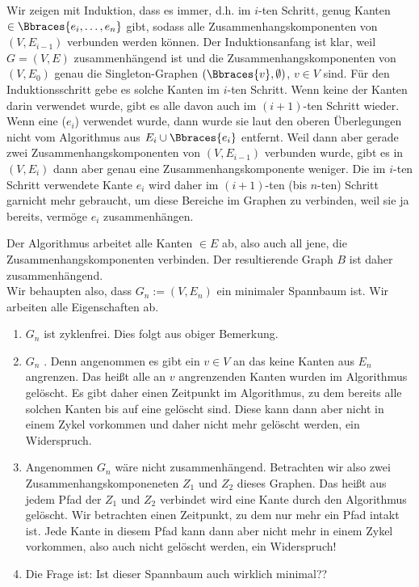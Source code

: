 \begin{solution}
\begin{enumerate}[label = (\Alph*)]
    Wir zeigen mit Induktion, dass es immer, d.h. im $i$-ten Schritt, genug Kanten $\in \Bbraces{e_i, \dots, e_n}$ gibt, sodass alle Zusammenhangskomponenten von $(V, E_{i-1})$ verbunden werden können.
    Der Induktionsanfang ist klar, weil $G = (V, E)$ zusammenhängend ist und die Zusammenhangskomponenten von $(V, E_0)$ genau die Singleton-Graphen $(\Bbraces{v}, \emptyset)$, $v \in V$ sind.
    Für den Induktionsschritt gebe es solche Kanten im $i$-ten Schritt.
    Wenn keine der Kanten darin verwendet wurde, gibt es alle davon auch im $(i+1)$-ten Schritt wieder.
    Wenn eine ($e_i$) verwendet wurde, dann wurde sie laut den oberen Überlegungen nicht vom Algorithmus aus $E_i \cup \Bbraces{e_i}$ entfernt.
    Weil dann aber gerade zwei Zusammenhangskomponenten von $(V, E_{i-1})$ verbunden wurde, gibt es in $(V, E_i)$ dann aber genau eine Zusammenhangskomponente weniger.
    Die im $i$-ten Schritt verwendete Kante $e_i$ wird daher im $(i+1)$-ten (bis $n$-ten) Schritt garnicht mehr gebraucht, um diese Bereiche im Graphen zu verbinden, weil sie ja bereits, vermöge $e_i$ zusammenhängen.

    Der Algorithmus arbeitet alle Kanten $\in E$ ab, also auch all jene, die Zusammenhangskomponenten verbinden.
    Der resultierende Graph $B$ ist daher zusammenhängend.\\ 
    
    Wir behaupten also, dass $G_n:=(V,E_n)$ ein minimaler Spannbaum ist. Wir arbeiten alle Eigenschaften ab.
    \begin{enumerate}
    	\item $G_n$ ist zyklenfrei. Dies folgt aus obiger Bemerkung. 
    	
    	\item $G_n$ . Denn angenommen es gibt ein $v \in V$ an das keine Kanten aus $E_n$ angrenzen. Das heißt alle an $v$ angrenzenden Kanten wurden im Algorithmus gelöscht. Es gibt daher einen Zeitpunkt im Algorithmus, zu dem bereits alle solchen Kanten bis auf eine gelöscht sind. Diese kann dann aber nicht in einem Zykel vorkommen und daher nicht mehr gelöscht werden, ein Widerspruch.
    	
    	\item Angenommen $G_n$ wäre nicht zusammenhängend. Betrachten wir also zwei Zusammenhangskomponeneten $Z_1$ und $Z_2$ dieses Graphen. Das heißt aus jedem Pfad der $Z_1$ und $Z_2$ verbindet wird eine Kante durch den Algorithmus gelöscht. Wir betrachten einen Zeitpunkt, zu dem nur mehr ein Pfad intakt ist. Jede Kante in diesem Pfad kann dann aber nicht mehr in einem Zykel vorkommen, also auch nicht gelöscht werden, ein Widerspruch!
    	
    	\item Die Frage ist: Ist dieser Spannbaum auch wirklich minimal?? 
    \end{enumerate}

\end{enumerate}

\end{solution}


